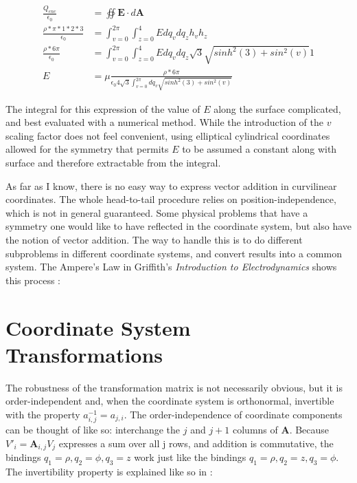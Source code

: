 \documentclass{article}
\begin{document}
\begin{align*}
\frac{Q_{enc}}{\epsilon_0} &= \oiint \textbf{E} \cdot d \textbf{A} \\
\frac{\rho * \pi * 1 * 2 * 3}{\epsilon_0} &= \int_{v=0}^{2 \pi} \int_{z=0}^{4} E dq_v dq_z h_v h_z \\
\frac{\rho * 6 \pi}{\epsilon_0} &= \int_{v=0}^{2 \pi} \int_{z=0}^{4} E dq_v dq_z \sqrt{3} \sqrt{sinh^2(3) + sin^2(v)} 1 \\
E &= \unit{\mu} \frac{\rho * 6 \pi}{\epsilon_0 4 \sqrt{3} \int_{v=0}^{2 \pi} dq_v \sqrt{sinh^2(3) + sin^2(v)}} 
\end{align*}

The integral for this expression of the value of $E$ along the surface complicated, and best evaluated with a numerical method. While the introduction of the $v$ scaling factor does not feel convenient, using elliptical cylindrical coordinates allowed for the symmetry that permits $E$ to be assumed a constant along with surface and therefore extractable from the integral.

As far as I know, there is no easy way to express vector addition in curvilinear coordinates. The whole head-to-tail procedure relies on position-independence, which is not in general guaranteed. Some physical problems that have a symmetry one would like to have reflected in the coordinate system, but also have the notion of vector addition. The way to handle this is to do different subproblems in different coordinate systems, and convert results into a common system. The Ampere's Law in Griffith's \textit{Introduction to Electrodynamics} shows this process \cite{griffiths}:

\section*{Coordinate System Transformations}
\label{sec:trans}

The robustness of the transformation matrix is not necessarily obvious, but it is order-independent and, when the coordinate system is orthonormal, invertible with the property $a_{i,j}^{-1} = a_{j,i}$. The order-independence of coordinate components can be thought of like so: interchange the $j$ and $j + 1$ columns of $\textbf{A}$. Because $ V'_i = \textbf{A}_{i,j} V_j $ expresses a sum over all j rows, and addition is commutative, the bindings $q_1 = \rho, q_2 = \phi, q_3 = z$ work just like the bindings $q_1 = \rho, q_2 = z, q_3 = \phi$. The invertibility property is explained like so in \cite{kusse}:
\end{document}
